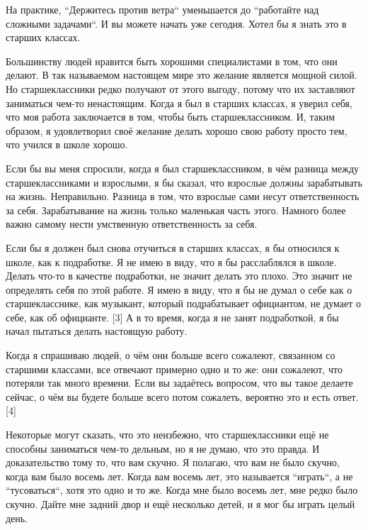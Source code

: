 \documentclass[ebook,12pt,oneside,openany]{memoir}
\begin{document}
На практике, ``Держитесь против ветра`` уменьшается до ``работайте над
сложными задачами``. И вы можете начать уже сегодня. Хотел бы я знать
это в старших классах. \newline

Большинству людей нравится быть хорошими специалистами в том, что они
делают. В так называемом настоящем мире это желание является мощной
силой. Но старшеклассники редко получают от этого выгоду, потому что
их заставляют заниматься чем-то ненастоящим. Когда я был в старших
классах, я уверил себя, что моя работа заключается в том, чтобы быть
старшеклассником. И, таким образом, я удовлетворил своё желание делать
хорошо свою работу просто тем, что учился в школе хорошо. \newline

Если бы вы меня спросили, когда я был старшеклассником, в чём разница
между старшеклассниками и взрослыми, я бы сказал, что взрослые должны
зарабатывать на жизнь. Неправильно. Разница в том, что взрослые сами
несут ответственность за себя. Зарабатывание на жизнь только маленькая
часть этого. Намного более важно самому нести умственную
ответственность за себя. \newline

Если бы я должен был снова отучиться в старших классах, я бы относился
к школе, как к подработке. Я не имею в виду, что я бы расслаблялся в
школе. Делать что-то в качестве подработки, не значит делать это
плохо. Это значит не определять себя по этой работе. Я имею в виду,
что я бы не думал о себе как о старшекласснике, как музыкант, который
подрабатывает официантом, не думает о себе, как об официанте. [3] А в
то время, когда я не занят подработкой, я бы начал пытаться делать
настоящую работу. \newline

Когда я спрашиваю людей, о чём они больше всего сожалеют, связанном со
старшими классами, все отвечают примерно одно и то же: они сожалеют,
что потеряли так много времени. Если вы задаётесь вопросом, что вы
такое делаете сейчас, о чём вы будете больше всего потом сожалеть,
вероятно это и есть ответ. [4] \newline

Некоторые могут сказать, что это неизбежно, что старшеклассники ещё не
способны заниматься чем-то дельным, но я не думаю, что это правда. И
доказательство тому то, что вам скучно. Я полагаю, что вам не было
скучно, когда вам было восемь лет. Когда вам восемь лет, это
называется ``играть``, а не ``тусоваться``, хотя это одно и то же. Когда
мне было восемь лет, мне редко было скучно. Дайте мне задний двор и
ещё несколько детей, и я мог бы играть целый день. \newline
\end{document}
